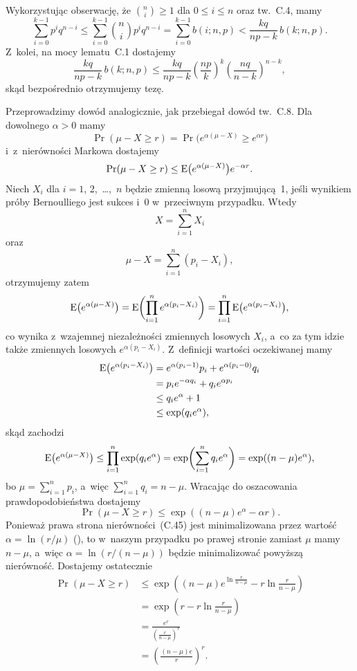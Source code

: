 \exercise{} %
Wykorzystując obserwację, że $\binom{n}{i}\ge1$ dla $0\le i\le n$ oraz tw.~C.4, mamy
\[
	\sum_{i=0}^{k-1}p^iq^{n-i} \le \sum_{i=0}^{k-1}\binom{n}{i}p^iq^{n-i} = \sum_{i=0}^{k-1}b(i;n,p) < \frac{kq}{np-k}\,b(k;n,p).
\]
Z~kolei, na mocy lematu~C.1 dostajemy
\[
	\frac{kq}{np-k}\,b(k;n,p) \le \frac{kq}{np-k}\left(\frac{np}{k}\right)^k\left(\frac{nq}{n-k}\right)^{n-k},
\]
skąd bezpośrednio otrzymujemy tezę.

\exercise{} %
Przeprowadzimy dowód analogicznie, jak przebiegał dowód tw.~C.8. Dla dowolnego $\alpha>0$ mamy
\[
	\Pr(\mu-X\ge r) = \Pr\bigl(e^{\alpha(\mu-X)}\ge e^{\alpha r}\bigr)
\]
i~z~nierówności Markowa dostajemy
\[
	\Pr(\mu-X\ge r) \le \operatorname{E}\bigl(e^{\alpha(\mu-X)}\bigr)e^{-\alpha r}.
\]
Niech $X_i$ dla $i=1$, 2,~\dots,~$n$ będzie zmienną losową przyjmującą~1, jeśli wynikiem  próby Bernoulliego jest sukces i~0 w~przeciwnym przypadku. Wtedy
\[
	X = \sum_{i=1}^nX_i
\]
oraz
\[
	\mu-X = \sum_{i=1}^n(p_i-X_i),
\]
otrzymujemy zatem
\[
	\operatorname{E}\bigl(e^{\alpha(\mu-X)}\bigr) = \operatorname{E}\biggl(\prod_{i=1}^ne^{\alpha(p_i-X_i)}\biggr) = \prod_{i=1}^n\operatorname{E}\bigl(e^{\alpha(p_i-X_i)}\bigr),
\]
co wynika z~wzajemnej niezależności zmiennych losowych $X_i$, a~co za tym idzie także zmiennych losowych $e^{\alpha(p_i-X_i)}$. Z~definicji wartości oczekiwanej mamy
\begin{align*}
	\operatorname{E}\bigl(e^{\alpha(p_i-X_i)}\bigr) &= e^{\alpha(p_i-1)}p_i+e^{\alpha(p_i-0)}q_i \\
	&= p_ie^{-\alpha q_i}+q_ie^{\alpha p_i} \\
	&\le q_ie^{\alpha}+1 \\
	&\le \exp(q_ie^\alpha),
\end{align*}
skąd zachodzi
\[
	\operatorname{E}\bigl(e^{\alpha(\mu-X)}\bigr) \le \prod_{i=1}^n\exp(q_ie^\alpha) = \exp\biggl(\sum_{i=1}^nq_ie^\alpha\biggr) = \exp((n-\mu)e^\alpha),
\]
bo $\mu=\sum_{i=1}^np_i$, a~więc $\sum_{i=1}^nq_i=n-\mu$. Wracając do oszacowania prawdopodobieństwa dostajemy
\[
	\Pr(\mu-X\ge r) \le \exp((n-\mu)e^\alpha-\alpha r).
\]
Ponieważ prawa strona nierówności~(C.45) jest minimalizowana przez wartość $\alpha=\ln(r/\mu)$ (), to w~naszym przypadku po prawej stronie zamiast $\mu$ mamy $n-\mu$, a~więc $\alpha=\ln(r/(n-\mu))$ będzie minimalizować powyższą nierówność. Dostajemy ostatecznie
\begin{align*}
	\Pr(\mu-X\ge r) &\le \exp\left((n-\mu)e^{\ln\frac{r}{n-\mu}}-r\ln\frac{r}{n-\mu}\right) \\
	&= \exp\left(r-r\ln\frac{r}{n-\mu}\right) \\
	&= \frac{e^r}{\left(\frac{r}{n-\mu}\right)^r} \\
	&= \left(\frac{(n-\mu)e}{r}\right)^r.
\end{align*}

